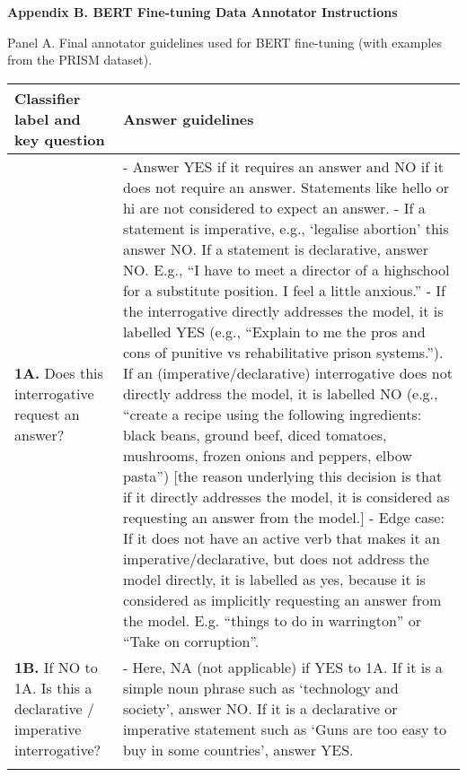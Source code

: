 \documentclass{article}
\begin{document}
\begin{center}
\textbf{\large Appendix B. BERT Fine-tuning Data Annotator Instructions}
\end{center}
\hspace*{0.75cm}Panel A. Final annotator guidelines used for BERT fine-tuning (with examples from the PRISM dataset). 

\vspace{1em}
{\small
\renewcommand{\arraystretch}{1.2}
\begin{tabular}{p{5.5cm} p{12.5cm}}
\toprule
\textbf{Classifier label and key question} & \textbf{Answer guidelines} \\
\midrule

\textbf{1A.} Does this interrogative request an answer? & 
- Answer YES if it requires an answer and NO if it does not require an answer. Statements like hello or hi are not considered to expect an answer. \newline
- If a statement is imperative, e.g., ‘legalise abortion’ this answer NO.  If a statement is declarative, answer NO. E.g., “I have to meet a director of a highschool for a substitute position. I feel a little anxious.” \newline
- If the interrogative directly addresses the model, it is labelled YES (e.g., “Explain to me the pros and cons of punitive vs rehabilitative prison systems.”). If an (imperative/declarative) interrogative does not directly address the model, it is labelled NO (e.g., “create a recipe using the following ingredients: black beans, ground beef, diced tomatoes, mushrooms, frozen onions and peppers, elbow pasta”) [the reason underlying this decision is that if it directly addresses the model, it is considered as requesting an answer from the model.] \newline
- Edge case: If it does not have an active verb that makes it an imperative/declarative, but does not address the model directly, it is labelled as yes, because it is considered as implicitly requesting an answer from the model. E.g. “things to do in warrington” or “Take on corruption”. \\
\addlinespace[0.8em]

\textbf{1B.} If NO to 1A. Is this a declarative / imperative interrogative? & 
- Here, NA (not applicable) if YES to 1A. If it is a simple noun phrase such as ‘technology and society’, answer NO. If it is a declarative or imperative statement such as ‘Guns are too easy to buy in some countries’, answer YES. \\
\addlinespace[0.8em]


\end{tabular}}
\end{document}
